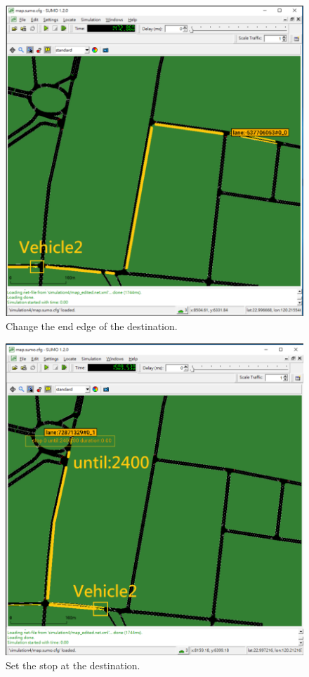 \documentclass[12pt]{ksthesis}
\begin{document}
\begin{thesis}
{\begin{figure}[H]
\centering
\includegraphics[scale=0.6]{./Thesis_figures/F4-3_Change_endEdge.PNG}
\caption{\large Change the end edge of the destination.}
\vspace{0.2cm}
\label{Fig:Change_endEdge}
\end{figure}

\begin{figure}[H]
\centering
\includegraphics[scale=0.6]{./Thesis_figures/F4-4_setStop.PNG}
\caption{\large Set the stop at the destination.}
\vspace{0.2cm}
\label{Fig:Set_stop}
\end{figure}

}
\end{thesis}
\end{document}
